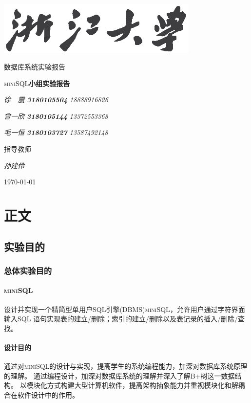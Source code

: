 \documentclass[UTF8]{ctexrep} %
\begin{document}
\begin{titlepage}
	\centering
	\includegraphics[width=0.75\textwidth]{figure/浙江大学.eps}\par\vspace{1cm}
	{\scshape\LARGE 数据库系统实验报告\par}
	\vspace{1.5cm}
	{\huge\textsc{\textsc{miniSQL}}\textbf{小组实验报告}\par}
	\vspace{2cm}
	{\Large\itshape 徐\ \ 震 \textbf{3180105504} 18888916826\par}
	{\Large\itshape 曾一欣 \textbf{3180105144} 13372553368\par}
	{\Large\itshape 毛一恒 \textbf{3180103727} 13587492148\par}
	\vfill
	指导教师\par
	\textit{孙建伶}

	\vfill

	{\large \today\par}
\end{titlepage}


\newpage
\tableofcontents
\newpage
\part{正文}
\chapter{实验目的}
\section{总体实验目的}
\subsection{\textsc{miniSQL}}
设计并实现一个精简型单用户SQL引擎(DBMS)\textsc{miniSQL}，允许用户通过字符界面输入SQL 语句实现表的建立/删除；索引的建立/删除以及表记录的插入/删除/查找。

\subsection{设计目的}
通过对\textsc{miniSQL}的设计与实现，提高学生的系统编程能力，加深对数据库系统原理的理解。
通过编程设计，加深对数据库系统的理解并深入了解B+树这一数据结构。
以模块化方式构建大型计算机软件，提高架构抽象能力并重视模块化和解耦合在软件设计中的作用。
\end{document}
